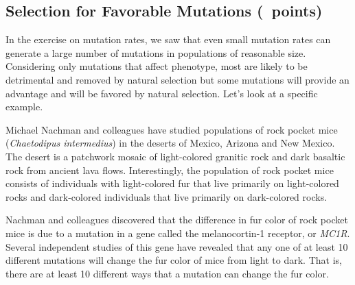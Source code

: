 \documentclass[11pt, addpoints]{exam}
\begin{document}
\subsection*{Selection for Favorable Mutations (\numpoints\ points)}

In the exercise on mutation rates, we saw that even small mutation rates
can generate a large number of mutations in populations of reasonable
size. Considering only mutations that affect phenotype, most are likely
to be detrimental and removed by natural selection but some mutations
will provide an advantage and will be favored by natural selection.
Let's look at a specific example.

Michael Nachman and colleagues have studied populations of rock pocket
mice (\textit{Chaetodipus intermedius}) in the deserts of Mexico, Arizona
and New Mexico. The desert is a patchwork mosaic of light-colored
granitic rock and dark basaltic rock from ancient lava flows.
Interestingly, the population of rock pocket mice consists of
individuals with light-colored fur that live primarily on light-colored
rocks and dark-colored individuals that live primarily on dark-colored
rocks.

Nachman and colleagues discovered that the difference in fur color of
rock pocket mice is due to a mutation in a gene called the
melanocortin-1 receptor, or \textit{MC1R}. Several independent studies of
this gene have revealed that any one of at least 10 different mutations
will change the fur color of mice from light to dark. That is, there are
at least 10 different ways that a mutation can change the fur color.
\end{document}
